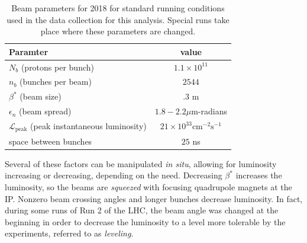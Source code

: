 \begin{table}
\centering
\begin{tabular}{lc}
\hline
Paramter & value  \\
\hline
$N_b$ (protons per bunch)                                           & $1.1 \times 10^{11}$   \\
$n_b$ (bunches per beam)                                            & $2544$   \\
$\beta^*$ (beam size)                                               & $.3$ m   \\
$\epsilon_n$ (beam spread)                                          & $1.8-2.2 \mu$m-radians   \\
$\mathcal{L}_{\textrm{peak}}$ (peak instantaneous luminosity)       & $21 \times 10^{33} \textrm{cm}^{-2}\textrm{s}^{-1}$   \\
space between bunches                                               & $25$ ns   \\
\hline
\end{tabular}
\caption{Beam parameters for 2018 for standard running conditions used in the data collection for this analysis. Special runs take place where these parameters are changed.}
\label{tab:lumi-vals}
\end{table}

Several of these factors can be manipulated \emph{in situ}, allowing for luminosity increasing or decreasing, depending on the need. Decreasing $\beta^*$ increases the luminosity, so the beams are \emph{squeezed} with focusing quadrupole magnets at the \ac{IP}. Nonzero beam crossing angles and longer bunches decrease luminosity. In fact, during some runs of Run 2 of the \ac{LHC}, the beam angle was changed at the beginning in order to decrease the luminosity to a level more tolerable by the experiments, referred to as \emph{leveling}. 



